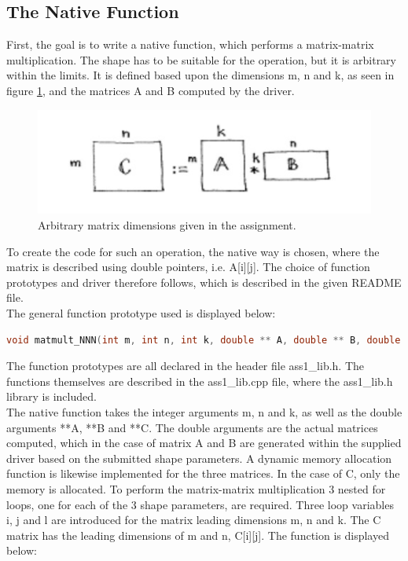 \subsection{The Native Function}

First, the goal is to write a native function, which performs a matrix-matrix multiplication. The shape has to be suitable for the operation, but it is arbitrary within the limits. It is defined based upon the dimensions m, n and k, as seen in figure \ref{fig:matrix1}, and the matrices A and B computed by the driver.

\begin{figure}[h!] 
	\begin{center}
		\includegraphics[width=0.9 \textwidth]{fig/matrix1.PNG} 
		\caption{Arbitrary matrix dimensions given in the assignment.}
		\label{fig:matrix1}
	\end{center}
\end{figure}


To create the code for such an operation, the native way is chosen, where the matrix is described using double pointers, i.e. A[i][j]. The choice of function prototypes and driver therefore follows, which is described in the given README file.  \\
The general function prototype used is displayed below:
\begin{lstlisting}[language=C++, caption=Function Prototype]
void matmult_NNN(int m, int n, int k, double ** A, double ** B, double ** C)
\end{lstlisting}

The function prototypes are all declared in the header file ass1\_lib.h. The functions themselves are described in the ass1\_lib.cpp file, where the ass1\_lib.h library is included. \\

The native function takes the integer arguments m, n and k, as well as the double arguments **A, **B and **C. The double arguments are the actual matrices computed, which in the case of matrix A and B are generated within the supplied driver based on the submitted shape parameters. A dynamic memory allocation function is likewise implemented for the three matrices. In the case of C, only the memory is allocated. To perform the matrix-matrix multiplication 3 nested for loops, one for each of the 3 shape parameters, are required. Three loop variables i, j and l are introduced for the matrix leading dimensions m, n and k. The C matrix has the leading dimensions of m and n, C[i][j]. The function is displayed below:

